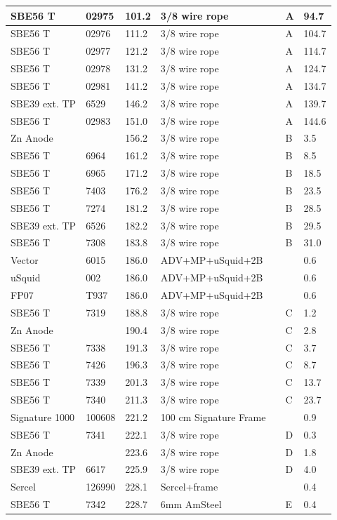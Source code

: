 \documentclass{article}
\begin{document}
\begin{tabularx}{\linewidth}{|l|l|l|X|l|l|l|}
SBE56 T & 02975 & 101.2 & 3/8 wire rope &  & A & 94.7 \\ \hline
SBE56 T & 02976 & 111.2 & 3/8 wire rope &  & A & 104.7 \\ \hline
SBE56 T & 02977 & 121.2 & 3/8 wire rope &  & A & 114.7 \\ \hline
SBE56 T & 02978 & 131.2 & 3/8 wire rope &  & A & 124.7 \\ \hline
SBE56 T & 02981 & 141.2 & 3/8 wire rope &  & A & 134.7 \\ \hline
SBE39 ext. TP & 6529 & 146.2 & 3/8 wire rope &  & A & 139.7 \\ \hline
SBE56 T & 02983 & 151.0 & 3/8 wire rope &  & A & 144.6 \\ \hline
Zn Anode &  & 156.2 & 3/8 wire rope &  & B & 3.5 \\ \hline
SBE56 T & 6964 & 161.2 & 3/8 wire rope &  & B & 8.5 \\ \hline
SBE56 T & 6965 & 171.2 & 3/8 wire rope &  & B & 18.5 \\ \hline
SBE56 T & 7403 & 176.2 & 3/8 wire rope &  & B & 23.5 \\ \hline
SBE56 T & 7274 & 181.2 & 3/8 wire rope &  & B & 28.5 \\ \hline
SBE39 ext. TP & 6526 & 182.2 & 3/8 wire rope &  & B & 29.5 \\ \hline
SBE56 T & 7308 & 183.8 & 3/8 wire rope &  & B & 31.0 \\ \hline
Vector & 6015 & 186.0 & ADV+MP+uSquid+2B &  &  & 0.6 \\ \hline
uSquid & 002 & 186.0 & ADV+MP+uSquid+2B &  &  & 0.6 \\ \hline
FP07 & T937 & 186.0 & ADV+MP+uSquid+2B &  &  & 0.6 \\ \hline
SBE56 T & 7319 & 188.8 & 3/8 wire rope &  & C & 1.2 \\ \hline
Zn Anode &  & 190.4 & 3/8 wire rope &  & C & 2.8 \\ \hline
SBE56 T & 7338 & 191.3 & 3/8 wire rope &  & C & 3.7 \\ \hline
SBE56 T & 7426 & 196.3 & 3/8 wire rope &  & C & 8.7 \\ \hline
SBE56 T & 7339 & 201.3 & 3/8 wire rope &  & C & 13.7 \\ \hline
SBE56 T & 7340 & 211.3 & 3/8 wire rope &  & C & 23.7 \\ \hline
Signature 1000 & 100608 & 221.2 & 100 cm Signature Frame &  &  & 0.9 \\ \hline
SBE56 T & 7341 & 222.1 & 3/8 wire rope &  & D & 0.3 \\ \hline
Zn Anode &  & 223.6 & 3/8 wire rope &  & D & 1.8 \\ \hline
SBE39 ext. TP & 6617 & 225.9 & 3/8 wire rope &  & D & 4.0 \\ \hline
Sercel & 126990 & 228.1 & Sercel+frame &  &  & 0.4 \\ \hline
SBE56 T & 7342 & 228.7 & 6mm AmSteel &  & E & 0.4 \\ \hline
\end{tabularx}
\end{document}
